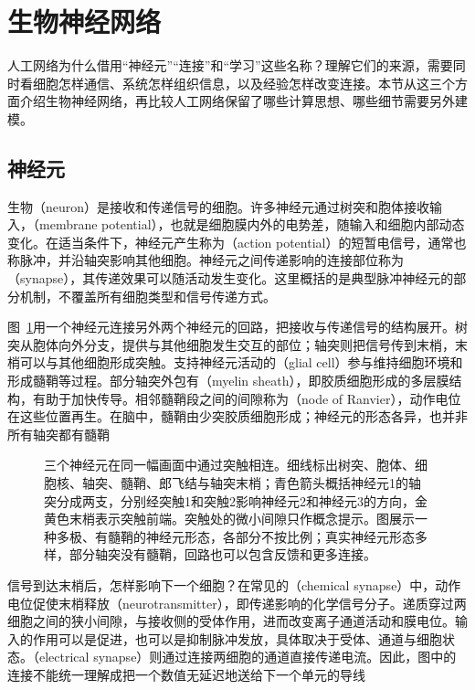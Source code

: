 \section{生物神经网络}
\label{sec:neural-biological-inspiration}

人工网络为什么借用“神经元”“连接”和“学习”这些名称？理解它们的来源，需要同时看细胞怎样通信、系统怎样组织信息，以及经验怎样改变连接。本节从这三个方面介绍生物神经网络，再比较人工网络保留了哪些计算思想、哪些细节需要另外建模。

\subsection{神经元}
\label{sec:neural-biological-unit}

生物（neuron）是接收和传递信号的细胞。许多神经元通过树突和胞体接收输入，（membrane potential），也就是细胞膜内外的电势差，随输入和细胞内部动态变化。在适当条件下，神经元产生称为（action potential）的短暂电信号，通常也称脉冲，并沿轴突影响其他细胞。神经元之间传递影响的连接部位称为（synapse），其传递效果可以随活动发生变化。这里概括的是典型脉冲神经元的部分机制，不覆盖所有细胞类型和信号传递方式。

图~\ref{fig:neural-biological-neuron}用一个神经元连接另外两个神经元的回路，把接收与传递信号的结构展开。树突从胞体向外分支，提供与其他细胞发生交互的部位；轴突则把信号传到末梢，末梢可以与其他细胞形成突触。支持神经元活动的（glial cell）参与维持细胞环境和形成髓鞘等过程。部分轴突外包有（myelin sheath），即胶质细胞形成的多层膜结构，有助于加快传导。相邻髓鞘段之间的间隙称为（node of Ranvier），动作电位在这些位置再生。在脑中，髓鞘由少突胶质细胞形成；神经元的形态各异，也并非所有轴突都有髓鞘

\begin{figure}[!t]
  \centering
  \resizebox{\linewidth}{!}{}
  \caption{三个神经元在同一幅画面中通过突触相连。细线标出树突、胞体、细胞核、轴突、髓鞘、郎飞结与轴突末梢；青色箭头概括神经元1的轴突分成两支，分别经突触1和突触2影响神经元2和神经元3的方向，金黄色末梢表示突触前端。突触处的微小间隙只作概念提示。图展示一种多极、有髓鞘的神经元形态，各部分不按比例；真实神经元形态多样，部分轴突没有髓鞘，回路也可以包含反馈和更多连接。}
  \label{fig:neural-biological-neuron}
\end{figure}

信号到达末梢后，怎样影响下一个细胞？在常见的（chemical synapse）中，动作电位促使末梢释放（neurotransmitter），即传递影响的化学信号分子。递质穿过两细胞之间的狭小间隙，与接收侧的受体作用，进而改变离子通道活动和膜电位。输入的作用可以是促进，也可以是抑制脉冲发放，具体取决于受体、通道与细胞状态。（electrical synapse）则通过连接两细胞的通道直接传递电流。因此，图中的连接不能统一理解成把一个数值无延迟地送给下一个单元的导线

